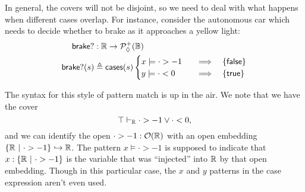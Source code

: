 In general, the covers will not be disjoint, so we need to deal with what happens when different cases overlap. For instance, consider the autonomous car which needs to decide whether to brake as it approaches a yellow light:
\begin{align*}
\mathsf{brake?} &: \mathbb{R} \to \mathcal{P}_\lozenge^+(\mathbb{B})
\\ \mathsf{brake?}(s) &\triangleq \mathsf{cases}(s)
\begin{cases}
x \models \cdot > - 1
  \quad &\Longrightarrow \quad
  \{ \mathsf{false} \}
\\
y \models \cdot < 0
  \quad &\Longrightarrow \quad
  \{ \mathsf{true} \}
\end{cases}
\end{align*}

The syntax for this style of pattern match is up in the air. We note that we have the cover
\[
\top \vdash_{\mathbb{R}} \cdot > -1 \vee \cdot < 0,
\]
and we can identify the open $\cdot > -1 : \mathcal{O}({\mathbb{R}})$ with an open embedding $\{ \mathbb{R} \ |\  \cdot > -1 \} \hookrightarrow \mathbb{R}$. The pattern $x \models \cdot > -1$ is supposed to indicate that $x : \{ \mathbb{R} \ |\  \cdot > -1 \}$ is the variable that was ``injected'' into $\mathbb{R}$ by that open embedding. Though in this particular case, the $x$ and $y$ patterns in the case expression aren't even used.


